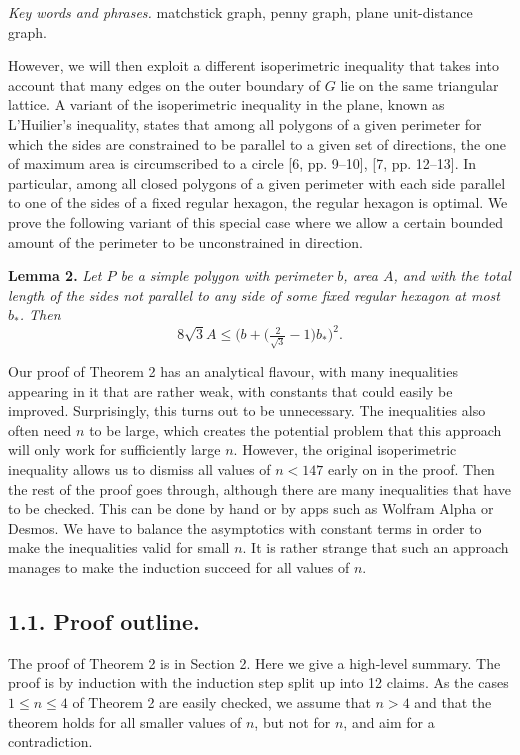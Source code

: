 \documentclass{article}
\begin{document}
\noindent \textit{Key words and phrases.} matchstick graph, penny graph, plane unit-distance graph.

However, we will then exploit a different isoperimetric inequality that takes into account that many edges on the outer boundary of $G$ lie on the same triangular lattice. A variant of the isoperimetric inequality in the plane, known as L’Huilier’s inequality, states that among all polygons of a given perimeter for which the sides are constrained to be parallel to a given set of directions, the one of maximum area is circumscribed to a circle [6, pp. 9–10], [7, pp. 12–13]. In particular, among all closed polygons of a given perimeter with each side parallel to one of the sides of a fixed regular hexagon, the regular hexagon is optimal. We prove the following variant of this special case where we allow a certain bounded amount of the perimeter to be unconstrained in direction.

\textbf{Lemma 2.} \textit{Let $P$ be a simple polygon with perimeter $b$, area $A$, and with the total length of the sides not parallel to any side of some fixed regular hexagon at most $b_{*}$. Then} 
\begin{equation*}
8\sqrt{3}A \le \bigl(b + \bigl(\tfrac{2}{\sqrt{3}} - 1\bigr)b_*\bigr)^2.
\end{equation*}

Our proof of Theorem 2 has an analytical flavour, with many inequalities appearing in it that are rather weak, with constants that could easily be improved. Surprisingly, this turns out to be unnecessary. The inequalities also often need $n$ to be large, which creates the potential problem that this approach will only work for sufficiently large $n$. However, the original isoperimetric inequality allows us to dismiss all values of $n < 147$ early on in the proof. Then the rest of the proof goes through, although there are many inequalities that have to be checked. This can be done by hand or by apps such as Wolfram Alpha or Desmos. We have to balance the asymptotics with constant terms in order to make the inequalities valid for small $n$. It is rather strange that such an approach manages to make the induction succeed for all values of $n$.

\subsection*{1.1. Proof outline.}

The proof of Theorem 2 is in Section 2. Here we give a high-level summary. The proof is by induction with the induction step split up into 12 claims. As the cases $1 \le n \le 4$ of Theorem 2 are easily checked, we assume that $n > 4$ and that the theorem holds for all smaller values of $n$, but not for $n$, and aim for a contradiction.
\end{document}
